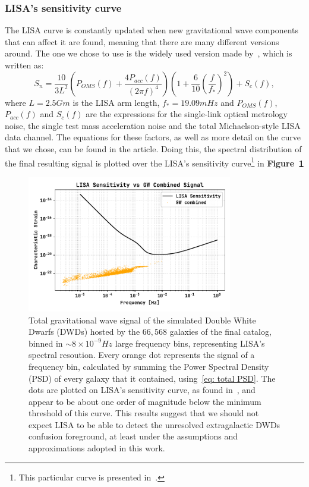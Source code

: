 \subsubsection{LISA's sensitivity curve}
The LISA curve is constantly updated when new gravitational wave components that can affect it are found, meaning that there are many different versions around.
The one we chose to use is the widely used version made by~\cite{Robson_2019}, which is written as:
\begin{equation}
    S_n = \frac{10}{3L^2} \left( P_{OMS}(f) + \frac{4P_{acc}(f)}{(2\pi f)^4} \right)\left( 1 + \frac{6}{10}\left(\frac{f}{f_*}\right)^2 \right) + S_c(f),
    \label{eq: LISA sensitivity curve by Robson}
\end{equation}
where $L=2.5 Gm$ is the LISA arm length, $f_*=19.09mHz$ and $P_{OMS}(f)$, $P_{acc}(f)$ and $S_c(f)$ are the expressions for the single-link optical metrology noise, the single test mass acceleration noise and the total Michaelson-style LISA data channel. 
The equations for these factors, as well as more detail on the curve that we chose, can be found in the article.
Doing this, the spectral distribution of the final resulting signal is plotted over the LISA's sensitivity curve\footnote{This particular curve is presented in~\cite{Robson_2019}.} in \textbf{Figure~\ref{fig: Final results plot}}
\begin{figure}[hb!]
    \begin{center}
        \includegraphics[width=0.8\textwidth]{images/Final_results_plot.pdf}
    \end{center}
    \caption{Total gravitational wave signal of the simulated Double White Dwarfs (DWDs) hosted by the $66,568$ galaxies of the final catalog, binned in $\sim 8\times10^{-9}Hz$ large frequency bins, representing LISA's spectral resoution. 
    Every orange dot represents the signal of a frequency bin, calculated by summing the Power Spectral Density (PSD) of every galaxy that it contained, using~\eqref{eq: total PSD}. 
    The dots are plotted on LISA's sensitivity curve, as found in~\cite{Robson_2019}, and appear to be about one order of magnitude below the minimum threshold of this curve.
    This results suggest that we should not expect LISA to be able to detect the unresolved extragalactic DWDs confusion foreground, at least under the assumptions and approximations adopted in this work.}\label{fig: Final results plot}
\end{figure}
